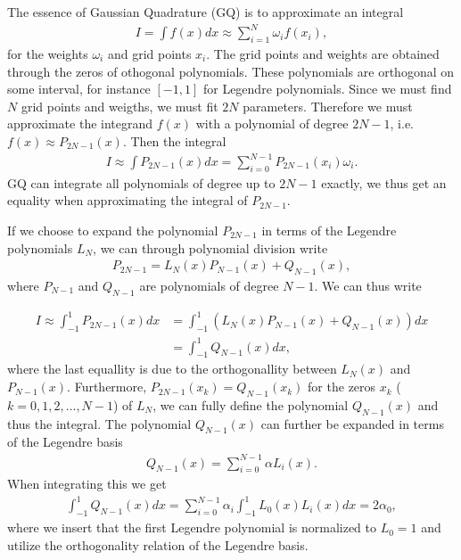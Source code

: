 \documentclass[10pt, twocolumn]{aastex62}
\begin{document}
The essence of Gaussian Quadrature (GQ) is to approximate an integral 
\begin{align}
	I = \int f(x) dx \approx \sum^N_{i = 1} \omega_i f(x_i),
	\label{eq:quadrature}
\end{align} 
for the weights $\omega_i$ and grid points $x_i$. The grid points and weights
are obtained through the zeros of othogonal polynomials. These polynomials are
orthogonal on some interval, for instance $[-1, 1]$ for Legendre polynomials.
Since we must find $N$ grid points and weigths, we must fit $2N$ parameters.
Therefore we must approximate the integrand $f(x)$ with a polynomial of degree
$2N-1$, i.e. $f(x) \approx P_{2N-1}(x)$. Then the integral 
\begin{align}
	I \approx \int P_{2N-1}(x)dx = \sum^{N-1}_{i=0}P_{2N-1}(x_i) \omega_i.
\end{align} 
GQ can integrate all polynomials of degree up to $2N-1$ exactly, we thus get
an equality when approximating the integral of $P_{2N-1}$. 

If we choose to expand the polynomial $P_{2N-1}$ in terms of the Legendre
polynomials $L_N$, we can through polynomial division write 
\begin{align}
	P_{2N-1} = L_N(x)P_{N-1}(x) + Q_{N-1}(x),
\end{align}
where $P_{N-1}$ and $Q_{N-1}$ are polynomials of degree $N-1$. We can thus write

\begin{align}
	I \approx \int^1_{-1} P_{2N-1}(x) dx &= \int^1_{-1} (L_N(x)P_{N-1}(x) + Q_{N-1}(x))dx \\
	&= \int^1_{-1}Q_{N-1}(x)dx,
\end{align}
where the last equallity is due to the orthogonallity between $L_N(x)$ and
$P_{N-1}(x)$. Furthermore, $P_{2N-1}(x_k) = Q_{N-1}(x_k)$ for the zeros $x_k$
($k = 0, 1, 2,\ldots, N-1$) of $L_N$, we can fully define the polynomial
$Q_{N-1}(x)$ and thus the integral. The polynomial $Q_{N-1}(x)$ can further be
expanded in terms of the Legendre basis 
\begin{align}
	Q_{N-1}(x) = \sum^{N-1}_{i=0} \alpha L_i(x).
	\label{eq:Qexpansion_of_x}
\end{align}
When integrating this we get
\begin{align}
	\int^1_{-1}Q_{N-1}(x)dx = \sum^{N-1}_{i=0} \alpha_i\int^1_{-1}L_0(x)L_i(x) dx = 2\alpha_0,
\end{align}
where we insert that the first Legendre polynomial is normalized to $L_0 = 1$
and utilize the orthogonality relation of the Legendre basis.
\end{document}
